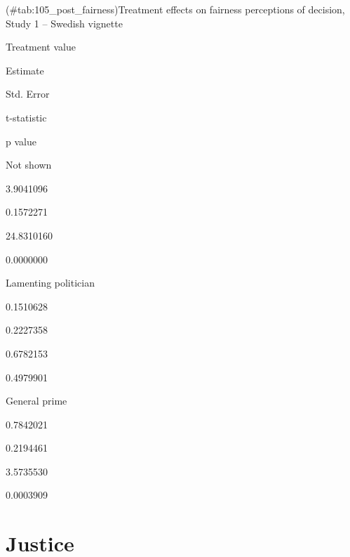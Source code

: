 \documentclass[]{book}
\begin{document}
(\#tab:105\_post\_fairness)Treatment effects on fairness perceptions of
decision, Study 1 -- Swedish vignette

Treatment value

Estimate

Std. Error

t-statistic

p value

Not shown

3.9041096

0.1572271

24.8310160

0.0000000

Lamenting politician

0.1510628

0.2227358

0.6782153

0.4979901

General prime

0.7842021

0.2194461

3.5735530

0.0003909

\section{Justice}\label{justice-1}
\end{document}
